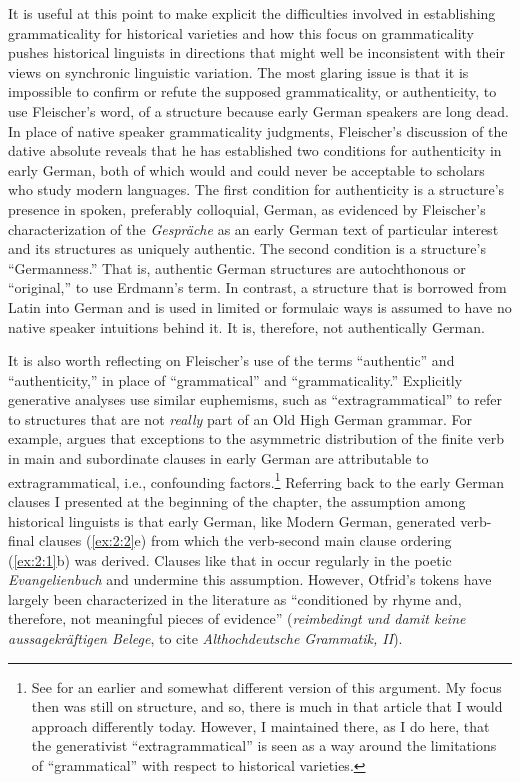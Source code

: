 It is useful at this point to make explicit the difficulties involved in establishing grammaticality for historical varieties and how this focus on grammaticality pushes historical linguists in directions that might well be inconsistent with their views on synchronic linguistic variation. The most glaring issue is that it is impossible to confirm or refute the supposed grammaticality, or authenticity, to use Fleischer’s word, of a structure because early German speakers are long dead. In place of native speaker grammaticality judgments, Fleischer’s discussion of the dative absolute reveals that he has established two conditions for authenticity in early German, both of which would and could never be acceptable to scholars who study modern languages. The first condition for authenticity is a structure’s presence in spoken, preferably colloquial, German, as evidenced by Fleischer’s characterization of the \textit{Gespräche} as an early German text of particular interest and its structures as uniquely authentic. The second condition is a structure’s “Germanness.” That is, authentic German structures are autochthonous or “original,” to use Erdmann’s term. In contrast, a structure that is borrowed from Latin into German and is used in limited or formulaic ways is assumed to have no native speaker intuitions behind it. It is, therefore, not authentically German.

It is also worth reflecting on Fleischer’s use of the terms “authentic” and “authenticity,” in place of “grammatical” and “grammaticality.” Explicitly generative analyses use similar euphemisms, such as “extragrammatical” to refer to structures that are not \textit{really} part of an Old High German grammar. For example, \citet[70, 77--78]{Axel2007} argues that exceptions to the asymmetric distribution of the finite verb in main and subordinate clauses in early German are attributable to extragrammatical, i.e., confounding factors.\footnote{{See \citet[360--364]{Somers2021a} for an earlier and somewhat different version of this argument. My focus then was still on structure, and so, there is much in that article that I would approach differently today. However, I maintained there, as I do here, that the generativist “extragrammatical” is seen as a way around the limitations of “grammatical” with respect to historical varieties.}}  Referring back to the early German clauses I presented at the beginning of the chapter, the assumption among historical linguists is that early German, like Modern German, generated verb-final clauses (\ref{ex:2:2}e) from which the verb-second main clause ordering (\ref{ex:2:1}b) was derived. Clauses like that in  occur regularly in the poetic \textit{Evangelienbuch} and undermine this assumption. However, Otfrid’s tokens have largely been characterized in the literature as “conditioned by rhyme and, therefore, not meaningful pieces of evidence” (\textit{reimbedingt und damit keine aussagekräftigen Belege}, to cite  \textit{Althochdeutsche Grammatik, II}).

